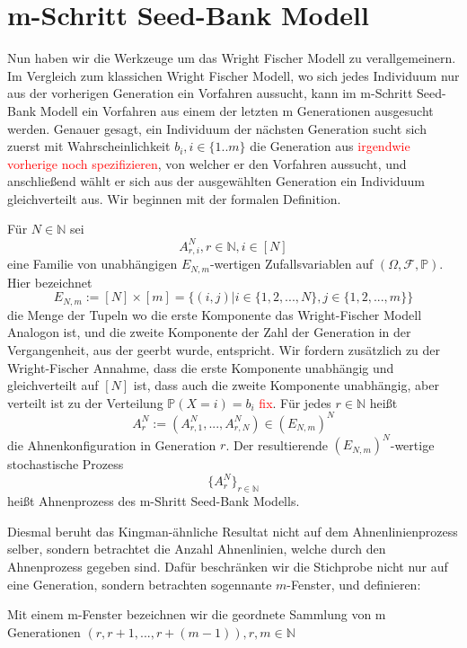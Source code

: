 \section{m-Schritt Seed-Bank Modell}
Nun haben wir die Werkzeuge um das Wright Fischer Modell zu verallgemeinern. Im Vergleich zum klassichen Wright Fischer Modell, wo sich jedes Individuum nur aus der vorherigen Generation ein Vorfahren aussucht, kann im m-Schritt Seed-Bank Modell ein Vorfahren aus einem der letzten m Generationen ausgesucht werden. Genauer gesagt, ein Individuum der nächsten Generation sucht sich zuerst mit Wahrscheinlichkeit $b_i, i \in \{1..m\}$ die Generation aus \textcolor{red}{irgendwie vorherige noch spezifizieren}, von welcher er den Vorfahren aussucht, und anschließend wählt er sich aus der ausgewählten Generation ein Individuum gleichverteilt aus. Wir beginnen mit der formalen Definition.
\begin{Definition}
    Für $N \in \mathbb{N}$ sei
    \[
        A^N_{r,i}, r \in \mathbb{N}, i \in [N]
    \]
    eine Familie von unabhängigen $E_{N,m}$-wertigen Zufallsvariablen auf $(\Omega,\mathcal{F},\mathbb{P})$. Hier bezeichnet 
    \[
        E_{N,m} := [N] \times [m] = \{(i,j) | i \in \{1,2,...,N\}, j \in \{1,2,...,m\}\}
    \] 
    die Menge der Tupeln wo die erste Komponente das Wright-Fischer Modell Analogon ist, und die zweite Komponente der Zahl der Generation in der Vergangenheit, aus der geerbt wurde, entspricht. Wir fordern zusätzlich zu der Wright-Fischer Annahme, dass die erste Komponente unabhängig und gleichverteilt auf $[N]$ ist, dass auch die zweite Komponente unabhängig, aber verteilt ist zu der Verteilung $\mathbb{P}(X = i) = b_i$ \textcolor{red}{fix}. 
    Für jedes $r \in \mathbb{N}$ heißt
    \[  
        A^N_r := (A^N_{r,1},...,A^N_{r,N}) \in (E_{N,m})^N
    \]
    die Ahnenkonfiguration in Generation $r$. Der resultierende $(E_{N,m})^N$-wertige stochastische Prozess
    \[
        \{A^N_r\}_{r \in \mathbb{N}}
    \]
    heißt Ahnenprozess des m-Shritt Seed-Bank Modells.
    
\end{Definition}
Diesmal beruht das Kingman-ähnliche Resultat nicht auf dem Ahnenlinienprozess selber, sondern betrachtet die Anzahl Ahnenlinien, welche durch den Ahnenprozess gegeben sind. Dafür beschränken wir die Stichprobe nicht nur auf eine Generation, sondern betrachten sogennante $m$-Fenster, und definieren:
\begin{Definition}[m-Fenster]
    Mit einem m-Fenster bezeichnen wir die geordnete Sammlung von m Generationen $(r,r+1,...,r + (m-1)), r,m \in \mathbb{N}$
\end{Definition}


